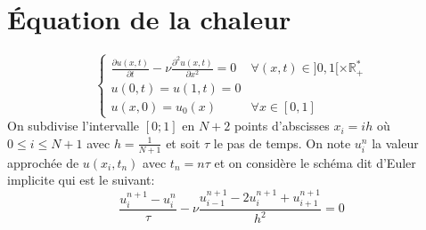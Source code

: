 \documentclass[a4paper,11pt]{article}
\begin{document}
\section{Équation de la chaleur}
\[\left\{\begin{array}{ll}
\displaystyle \frac{\partial u(x,t)}{\partial t} -\nu \frac{\partial^2u(x,t)}{\partial x^2}=0 & \forall (x,t)\in ]0,1[\times \mathbb{R}_+^*\\
u(0,t)=u(1,t)=0&\\
u(x,0)=u_0(x) & \forall x \in [0,1]
\end{array}\right.
\]
 On subdivise l'intervalle $[0; 1]$ en $N+2$ points d'abscisses $x_i = ih$ où $0\leq i\leq N+1$ avec $h = \frac 1{N+1}$ et soit $\tau$ le pas de temps.  On note $u^n_i$ la valeur approchée de $u(x_i,t_n)$ avec $t_n=n\tau$ et on considère le schéma dit d'Euler implicite qui est le suivant:
 \[ \frac{u_{i}^{n+1}-u_{i}^n}{\tau}-\nu \frac{u_{i-1}^{n+1}-2u_i^{n+1}+u_{i+1}^{n+1}}{h^2}=0
\]
  
\end{document}
